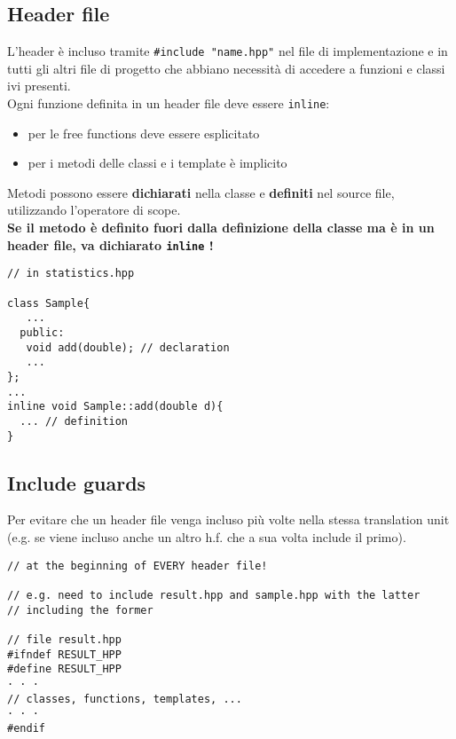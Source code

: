 \documentclass[10pt, oneside]{Book}
\begin{document}
\subsection{Header file}
L'header è incluso tramite \texttt{\#include "name.hpp"} nel file di implementazione e in tutti gli altri file di progetto che abbiano necessità di accedere a funzioni e classi ivi presenti.
\\Ogni funzione definita in un header file deve essere \texttt{inline}:
\begin{itemize}
\item per le free functions deve essere esplicitato
\item per i metodi delle classi e i template è implicito
\end{itemize}
Metodi possono essere \textbf{dichiarati} nella classe e \textbf{definiti} nel source file, utilizzando l'operatore di scope.
\\\textbf{Se il metodo è definito fuori dalla definizione della classe ma è in un header file, va dichiarato \texttt{inline} !}
\begin{verbatim}
// in statistics.hpp

class Sample{
   ...
  public:
   void add(double); // declaration
   ...
};
...
inline void Sample::add(double d){
  ... // definition
}
\end{verbatim}

\subsection{Include guards}
Per evitare che un header file venga incluso più volte nella stessa translation unit (e.g. se viene incluso anche un altro h.f. che a sua volta include il primo).
\begin{verbatim}
// at the beginning of EVERY header file!

// e.g. need to include result.hpp and sample.hpp with the latter 
// including the former

// file result.hpp
#ifndef RESULT_HPP
#define RESULT_HPP
· · ·
// classes, functions, templates, ...
· · ·
#endif
\end{verbatim}
\end{document}
